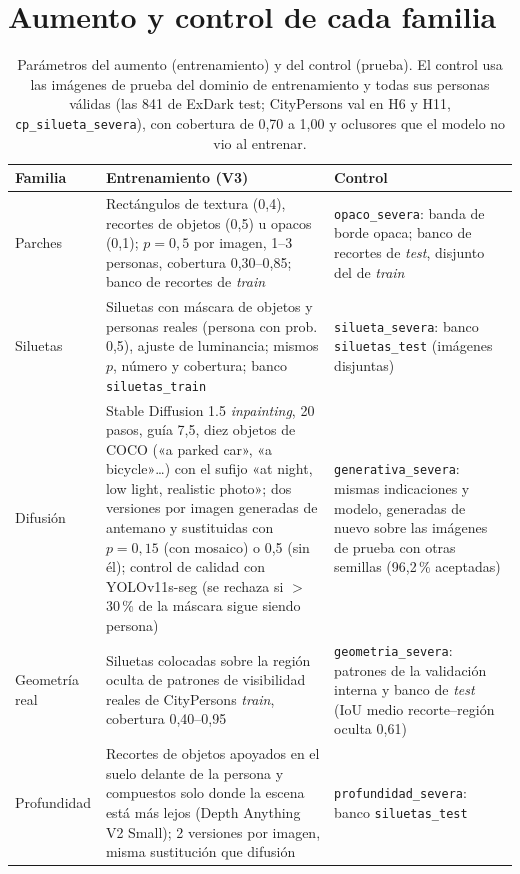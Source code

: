 \documentclass[10pt]{article}
\begin{document}
\section{Aumento y control de cada familia}
\begin{table}[H]\centering\small
\caption{Parámetros del aumento (entrenamiento) y del control (prueba). El control usa las imágenes de prueba del dominio de entrenamiento y todas sus personas válidas (las 841 de ExDark test; CityPersons val en H6 y H11, \texttt{cp\_silueta\_severa}), con cobertura de 0,70 a 1,00 y oclusores que el modelo no vio al entrenar.}
\begin{tabular}{@{}p{2.2cm}p{7.0cm}p{6.6cm}@{}}\toprule
Familia & Entrenamiento (V3) & Control \\\midrule
Parches & Rectángulos de textura (0,4), recortes de objetos (0,5) u opacos (0,1); $p=0{,}5$ por imagen, 1--3 personas, cobertura 0,30--0,85; banco de recortes de \emph{train} & \texttt{opaco\_severa}: banda de borde opaca; banco de recortes de \emph{test}, disjunto del de \emph{train} \\
Siluetas & Siluetas con máscara de objetos y personas reales (persona con prob. 0,5), ajuste de luminancia; mismos $p$, número y cobertura; banco \texttt{siluetas\_train} & \texttt{silueta\_severa}: banco \texttt{siluetas\_test} (imágenes disjuntas) \\
Difusión & Stable Diffusion 1.5 \emph{inpainting}, 20 pasos, guía 7,5, diez objetos de COCO («a parked car», «a bicycle»…) con el sufijo «at night, low light, realistic photo»; dos versiones por imagen generadas de antemano y sustituidas con $p=0{,}15$ (con mosaico) o 0,5 (sin él); control de calidad con YOLOv11s-seg (se rechaza si $>$30\,\% de la máscara sigue siendo persona) & \texttt{generativa\_severa}: mismas indicaciones y modelo, generadas de nuevo sobre las imágenes de prueba con otras semillas (96,2\,\% aceptadas) \\
Geometría real & Siluetas colocadas sobre la región oculta de patrones de visibilidad reales de CityPersons \emph{train}, cobertura 0,40--0,95 & \texttt{geometria\_severa}: patrones de la validación interna y banco de \emph{test} (IoU medio recorte--región oculta 0,61) \\
Profundidad & Recortes de objetos apoyados en el suelo delante de la persona y compuestos solo donde la escena está más lejos (Depth Anything V2 Small); 2 versiones por imagen, misma sustitución que difusión & \texttt{profundidad\_severa}: banco \texttt{siluetas\_test} \\
\bottomrule\end{tabular}\end{table}
\end{document}
